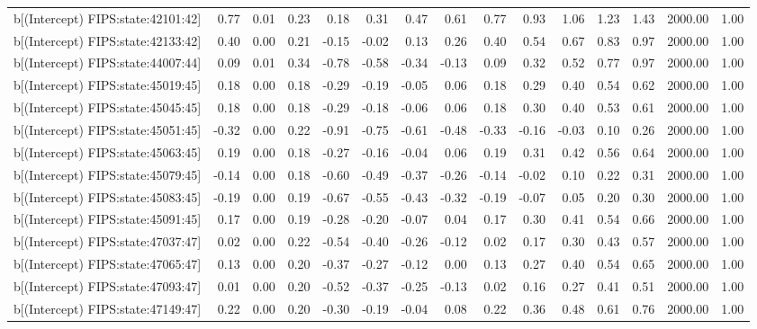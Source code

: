 \begin{table}[ht]
\begin{tabular}{rrrrrrrrrrrrrrr}
  b[(Intercept) FIPS:state:42101:42] & 0.77 & 0.01 & 0.23 & 0.18 & 0.31 & 0.47 & 0.61 & 0.77 & 0.93 & 1.06 & 1.23 & 1.43 & 2000.00 & 1.00 \\ 
  b[(Intercept) FIPS:state:42133:42] & 0.40 & 0.00 & 0.21 & -0.15 & -0.02 & 0.13 & 0.26 & 0.40 & 0.54 & 0.67 & 0.83 & 0.97 & 2000.00 & 1.00 \\ 
  b[(Intercept) FIPS:state:44007:44] & 0.09 & 0.01 & 0.34 & -0.78 & -0.58 & -0.34 & -0.13 & 0.09 & 0.32 & 0.52 & 0.77 & 0.97 & 2000.00 & 1.00 \\ 
  b[(Intercept) FIPS:state:45019:45] & 0.18 & 0.00 & 0.18 & -0.29 & -0.19 & -0.05 & 0.06 & 0.18 & 0.29 & 0.40 & 0.54 & 0.62 & 2000.00 & 1.00 \\ 
  b[(Intercept) FIPS:state:45045:45] & 0.18 & 0.00 & 0.18 & -0.29 & -0.18 & -0.06 & 0.06 & 0.18 & 0.30 & 0.40 & 0.53 & 0.61 & 2000.00 & 1.00 \\ 
  b[(Intercept) FIPS:state:45051:45] & -0.32 & 0.00 & 0.22 & -0.91 & -0.75 & -0.61 & -0.48 & -0.33 & -0.16 & -0.03 & 0.10 & 0.26 & 2000.00 & 1.00 \\ 
  b[(Intercept) FIPS:state:45063:45] & 0.19 & 0.00 & 0.18 & -0.27 & -0.16 & -0.04 & 0.06 & 0.19 & 0.31 & 0.42 & 0.56 & 0.64 & 2000.00 & 1.00 \\ 
  b[(Intercept) FIPS:state:45079:45] & -0.14 & 0.00 & 0.18 & -0.60 & -0.49 & -0.37 & -0.26 & -0.14 & -0.02 & 0.10 & 0.22 & 0.31 & 2000.00 & 1.00 \\ 
  b[(Intercept) FIPS:state:45083:45] & -0.19 & 0.00 & 0.19 & -0.67 & -0.55 & -0.43 & -0.32 & -0.19 & -0.07 & 0.05 & 0.20 & 0.30 & 2000.00 & 1.00 \\ 
  b[(Intercept) FIPS:state:45091:45] & 0.17 & 0.00 & 0.19 & -0.28 & -0.20 & -0.07 & 0.04 & 0.17 & 0.30 & 0.41 & 0.54 & 0.66 & 2000.00 & 1.00 \\ 
  b[(Intercept) FIPS:state:47037:47] & 0.02 & 0.00 & 0.22 & -0.54 & -0.40 & -0.26 & -0.12 & 0.02 & 0.17 & 0.30 & 0.43 & 0.57 & 2000.00 & 1.00 \\ 
  b[(Intercept) FIPS:state:47065:47] & 0.13 & 0.00 & 0.20 & -0.37 & -0.27 & -0.12 & 0.00 & 0.13 & 0.27 & 0.40 & 0.54 & 0.65 & 2000.00 & 1.00 \\ 
  b[(Intercept) FIPS:state:47093:47] & 0.01 & 0.00 & 0.20 & -0.52 & -0.37 & -0.25 & -0.13 & 0.02 & 0.16 & 0.27 & 0.41 & 0.51 & 2000.00 & 1.00 \\ 
  b[(Intercept) FIPS:state:47149:47] & 0.22 & 0.00 & 0.20 & -0.30 & -0.19 & -0.04 & 0.08 & 0.22 & 0.36 & 0.48 & 0.61 & 0.76 & 2000.00 & 1.00 \\ 

\end{tabular}
\end{table}
